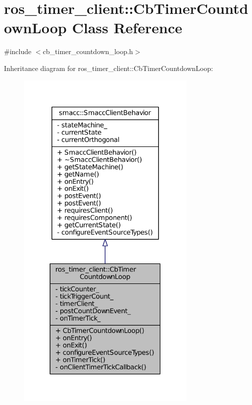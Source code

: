 \hypertarget{classros__timer__client_1_1CbTimerCountdownLoop}{}\section{ros\+\_\+timer\+\_\+client\+:\+:Cb\+Timer\+Countdown\+Loop Class Reference}
\label{classros__timer__client_1_1CbTimerCountdownLoop}


{\ttfamily \#include $<$cb\+\_\+timer\+\_\+countdown\+\_\+loop.\+h$>$}



Inheritance diagram for ros\+\_\+timer\+\_\+client\+:\+:Cb\+Timer\+Countdown\+Loop\+:
\nopagebreak
\begin{figure}[H]
\begin{center}
\leavevmode
\includegraphics[width=247pt]{classros__timer__client_1_1CbTimerCountdownLoop__inherit__graph}
\end{center}
\end{figure}


